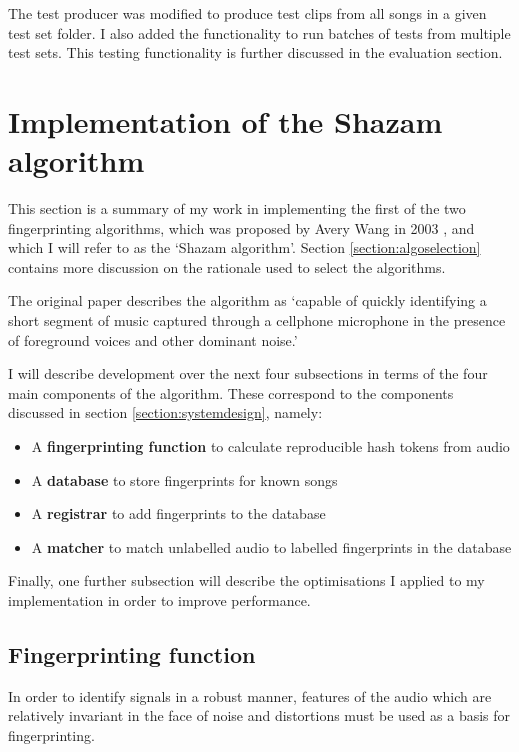 \documentclass[12pt,a4paper,twoside,openright]{report}
\begin{document}
The test producer was modified to produce test clips from all songs in a given test set folder. I also added the functionality to run batches of tests from multiple test sets. This testing functionality is further discussed in the evaluation section. %



\section{Implementation of the Shazam algorithm}
\label{section:shazam}

This section is a summary of my work in implementing the first of the two fingerprinting algorithms, which was proposed by Avery Wang in 2003 \cite{Wang03}, and which I will refer to as the `Shazam algorithm'. Section \ref{section:algoselection} contains more discussion on the rationale used to select the algorithms.

The original paper describes the algorithm as `capable of quickly identifying a short segment of music captured through a cellphone microphone in the presence of foreground voices and other dominant noise.' %

I will describe development over the next four subsections in terms of the four main components of the algorithm. These correspond to the components discussed in section \ref{section:systemdesign}, namely: 

\begin{itemize}
  \item A \textbf{fingerprinting function} to calculate reproducible hash tokens from audio
  \item A \textbf{database} to store fingerprints for known songs
  \item A \textbf{registrar} to add fingerprints to the database
  \item A \textbf{matcher} to match unlabelled audio to labelled fingerprints in the database
\end{itemize}

Finally, one further subsection will describe the optimisations I applied to my implementation in order to improve performance.

\subsection{Fingerprinting function}

In order to identify signals in a robust manner, features of the audio which are relatively invariant in the face of noise and distortions must be used as a basis for fingerprinting.
\end{document}
